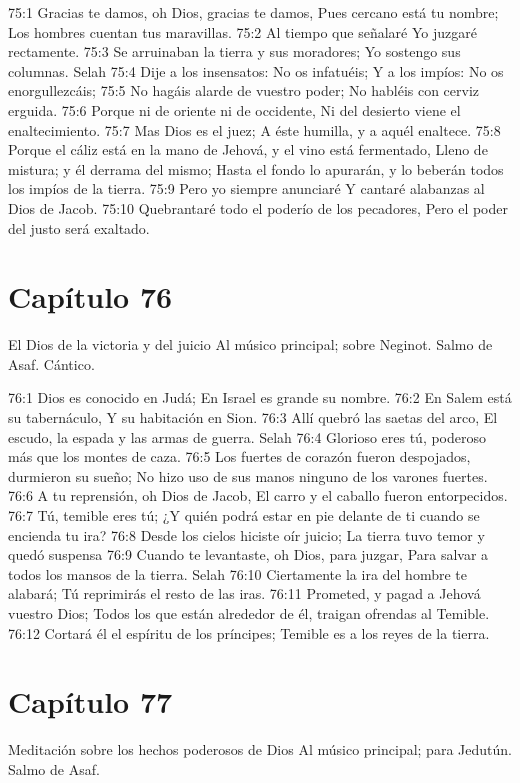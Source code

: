 75:1 Gracias te damos, oh Dios, gracias te damos, 
Pues cercano está tu nombre; 
Los hombres cuentan tus maravillas. 
75:2 Al tiempo que señalaré 
Yo juzgaré rectamente. 
75:3 Se arruinaban la tierra y sus moradores; 
Yo sostengo sus columnas. Selah 
75:4 Dije a los insensatos: No os infatuéis; 
Y a los impíos: No os enorgullezcáis; 
75:5 No hagáis alarde de vuestro poder; 
No habléis con cerviz erguida. 
75:6 Porque ni de oriente ni de occidente, 
Ni del desierto viene el enaltecimiento. 
75:7 Mas Dios es el juez; 
A éste humilla, y a aquél enaltece. 
75:8 Porque el cáliz está en la mano de Jehová, y el vino está fermentado, 
Lleno de mistura; y él derrama del mismo; 
Hasta el fondo lo apurarán, y lo beberán todos los impíos de la tierra. 
75:9 Pero yo siempre anunciaré 
Y cantaré alabanzas al Dios de Jacob. 
75:10 Quebrantaré todo el poderío de los pecadores, 
Pero el poder del justo será exaltado. 
\section*{Capítulo 76}
El Dios de la victoria y del juicio 
Al músico principal; sobre Neginot. Salmo de Asaf. Cántico. 
 
76:1 Dios es conocido en Judá; 
En Israel es grande su nombre. 
76:2 En Salem está su tabernáculo, 
Y su habitación en Sion. 
76:3 Allí quebró las saetas del arco, 
El escudo, la espada y las armas de guerra. Selah 
76:4 Glorioso eres tú, poderoso más que los montes de caza. 
76:5 Los fuertes de corazón fueron despojados, durmieron su sueño; 
No hizo uso de sus manos ninguno de los varones fuertes. 
76:6 A tu reprensión, oh Dios de Jacob, 
El carro y el caballo fueron entorpecidos. 
76:7 Tú, temible eres tú; 
¿Y quién podrá estar en pie delante de ti cuando se encienda tu ira? 
76:8 Desde los cielos hiciste oír juicio; 
La tierra tuvo temor y quedó suspensa 
76:9 Cuando te levantaste, oh Dios, para juzgar, 
Para salvar a todos los mansos de la tierra. Selah 
76:10 Ciertamente la ira del hombre te alabará; 
Tú reprimirás el resto de las iras. 
76:11 Prometed, y pagad a Jehová vuestro Dios; 
Todos los que están alrededor de él, traigan ofrendas al Temible. 
76:12 Cortará él el espíritu de los príncipes; 
Temible es a los reyes de la tierra. 
\section*{Capítulo 77}
Meditación sobre los hechos poderosos de Dios 
Al músico principal; para Jedutún. Salmo de Asaf. 
 
